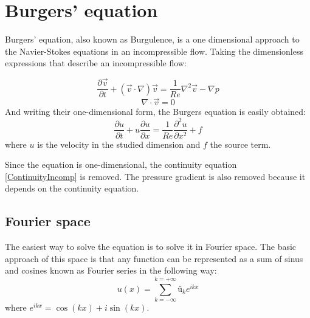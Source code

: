 \chapter{Burgers' equation}
Burgers' equation, also known as Burgulence, is a one dimensional approach to the Navier-Stokes equations in an incompressible flow. Taking the dimensionless expressions that describe an incompressible flow:


\begin{equation}
\frac{\partial\vec{v}}{\partial t}+\left(\vec{v}\cdot\nabla\right)\vec{v}=\frac{1}{Re}\nabla^{2}\vec{v}-\nabla p
\end{equation}
\begin{equation}
\nabla\cdot\vec{v}=0
\label{ContinuityIncomp}
\end{equation}
And writing their one-dimensional form, the Burgers equation is easily obtained:
\begin{equation}
\frac{\partial u}{\partial t}+u\frac{\partial u}{\partial x}=\frac{1}{Re}\frac{\partial^{2}u}{\partial x^{2}}+f
\end{equation}
where $u$ is the velocity in the studied dimension and $f$ the source term.

Since the equation is one-dimensional, the continuity equation \ref{ContinuityIncomp} is removed. The pressure gradient is also removed because it depends on the continuity equation.

\section{Fourier space}
The easiest way to solve the equation is to solve it in Fourier space. The basic approach of this space is that any function can be represented as a sum of sinus and cosines known as Fourier series in the following way:
\begin{equation}
u\left(x\right)=\sum_{k=-\infty}^{k=+\infty}û_{k}e^{ikx}
\end{equation}
where $e^{ikx}=\cos\left(kx\right)+i\sin\left(kx\right)$.

